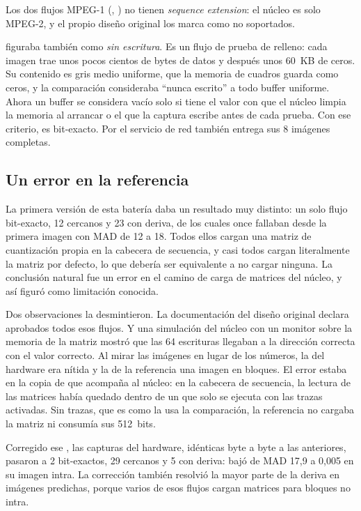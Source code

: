Los dos flujos MPEG-1 (, ) no tienen
\emph{sequence extension}: el núcleo es solo MPEG-2, y el propio diseño
original los marca como no soportados.

 figuraba también como \emph{sin escritura}. Es un flujo de
prueba de relleno: cada imagen trae unos pocos cientos de bytes de datos y
después unos 60~KB de ceros. Su contenido es gris medio uniforme, que la
memoria de cuadros guarda como ceros, y la comparación consideraba
\enquote{nunca escrito} a todo buffer uniforme. Ahora un buffer se considera
vacío solo si tiene el valor con que el núcleo limpia la memoria al
arrancar o el que la captura escribe antes de cada prueba. Con ese
criterio,  es bit-exacto. Por el servicio de red también
entrega sus 8 imágenes completas.

\subsection{Un error en la referencia}
\label{sec:conformidad-referencia}

La primera versión de esta batería daba un resultado muy distinto: un solo
flujo bit-exacto, 12 cercanos y 23 con deriva, de los cuales once fallaban
desde la primera imagen con MAD de 12 a 18. Todos ellos cargan una matriz de
cuantización propia en la cabecera de secuencia, y casi todos cargan
literalmente la matriz por defecto, lo que debería ser equivalente a no
cargar ninguna. La conclusión natural fue un error en el camino de carga de
matrices del núcleo, y así figuró como limitación conocida.

Dos observaciones la desmintieron. La documentación del diseño original
declara aprobados todos esos flujos. Y una simulación del núcleo con un
monitor sobre la memoria de la matriz mostró que las 64 escrituras llegaban
a la dirección correcta con el valor correcto. Al mirar las imágenes en
lugar de los números, la del hardware era nítida y la de la referencia una
imagen en bloques. El error estaba en la copia de  que
acompaña al núcleo: en la cabecera de secuencia, la lectura de las matrices
había quedado dentro de un  que solo se ejecuta con las trazas
activadas. Sin trazas, que es como la usa la comparación, la referencia no
cargaba la matriz ni consumía sus 512~bits.

Corregido ese , las capturas del hardware, idénticas byte a byte a
las anteriores, pasaron a 2 bit-exactos, 29 cercanos y 5 con deriva:
 bajó de MAD 17,9 a 0,005 en su imagen intra. La corrección también resolvió la mayor parte de la deriva en
imágenes predichas, porque varios de esos flujos cargan matrices para
bloques no intra.

